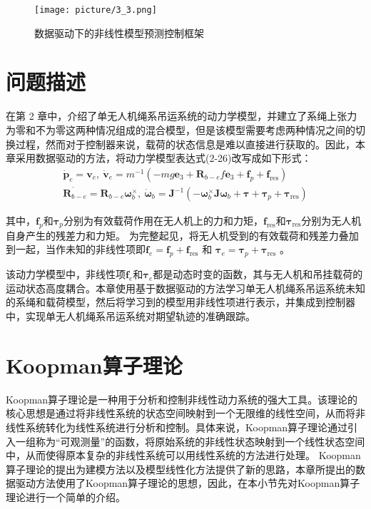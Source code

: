 \documentclass[lang=chs, degree=master, blindreview=true, winfonts=true]{yanputhesis}
\begin{document}
\begin{figure}[hbt!]
	\centering
	\texttt{[image: picture/3\_3.png]} 
	\caption{数据驱动下的非线性模型预测控制框架} 
	\label{illustration_framework}
\end{figure}

\section{问题描述}
在第 2 章中，介绍了单无人机绳系吊运系统的动力学模型，并建立了系绳上张力为零和不为零这两种情况组成的混合模型，但是该模型需要考虑两种情况之间的切换过程，然而对于控制器来说，载荷的状态信息是难以直接进行获取的。因此，本章采用数据驱动的方法，将动力学模型表达式(2-26)改写成如下形式：
\begin{equation}
	\begin{aligned}
		\dot{\boldsymbol{p}}_e = \boldsymbol{v}_e, \
		\dot{\boldsymbol{v}}_e = m^{-1}\left(-mg\bm{e}_3+\boldsymbol{R}_{b-e}f\bm{e}_3+\bm{f}_p+\bm{f}_{\text{res}}\right) \\
		\dot{\bm{R}_{b-e}} = \bm{R}_{b-e} \bm{\omega}_b^{\times}, \
		\dot{\boldsymbol{\omega}}_b = \boldsymbol{J}^{-1}\left(-\bm{\omega}_b^{\times}\bm{J} \bm{\omega}_b+\boldsymbol{\tau}+ \bm{\tau}_p+ \bm{\tau}_{\text{res}}\right)
	\end{aligned}\label{3-1}
\end{equation}



其中，$\bm{f}_p$和$\bm{\tau}_p$分别为有效载荷作用在无人机上的力和力矩，$\bm{f}_\text{res}$和$\bm{\tau}_\text{res}$分别为无人机自身产生的残差力和力矩。
为完整起见，将无人机受到的有效载荷和残差力叠加到一起，当作未知的非线性项即$\bm f_e = \bm f_p+ \bm f_{\text{res}}$ 和 $\bm \tau_e = \bm \tau_p+\bm \tau_{\text{res}}$ 。
	
该动力学模型中，非线性项$\bm f_e$和$\bm \tau_e$都是动态时变的函数，其与无人机和吊挂载荷的运动状态高度耦合。本章使用基于数据驱动的方法学习单无人机绳系吊运系统未知的系绳和载荷模型，然后将学习到的模型用非线性项进行表示，并集成到控制器中，实现单无人机绳系吊运系统对期望轨迹的准确跟踪。 




\section{Koopman算子理论}

Koopman算子理论是一种用于分析和控制非线性动力系统的强大工具\cite{1931Hamiltonian}。该理论的核心思想是通过将非线性系统的状态空间映射到一个无限维的线性空间，从而将非线性系统转化为线性系统进行分析和控制。具体来说，Koopman算子理论通过引入一组称为“可观测量”的函数，将原始系统的非线性状态映射到一个线性状态空间中，从而使得原本复杂的非线性系统可以用线性系统的方法进行处理。
Koopman算子理论的提出为建模方法以及模型线性化方法提供了新的思路，本章所提出的数据驱动方法使用了Koopman算子理论的思想，因此，在本小节先对Koopman算子理论进行一个简单的介绍。
\end{document}
